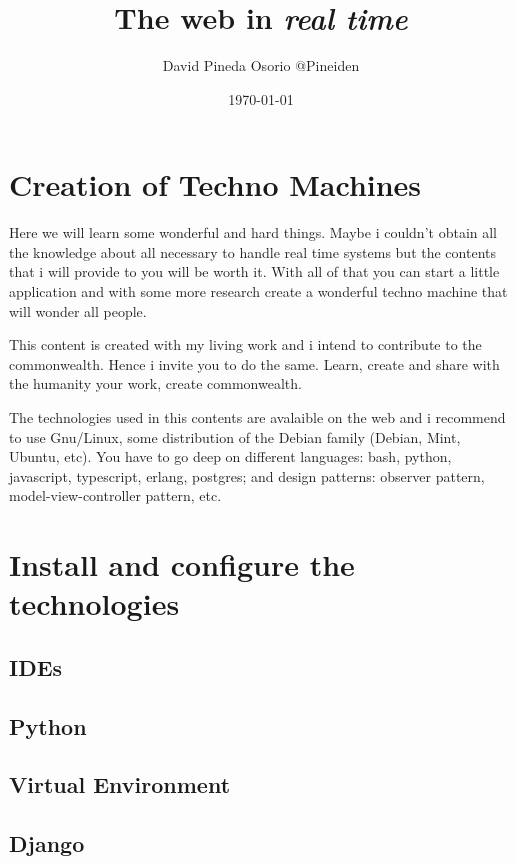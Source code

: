 \documentclass[11pt]{article}
\author{David Pineda Osorio @Pineiden}
\date{\today}
\title{The web in \emph{real time}}
\begin{document}
\maketitle
\tableofcontents


\section{Creation of Techno Machines}
\label{sec:orgf4ee783}

Here we will learn some wonderful and hard things. Maybe i couldn't obtain all the knowledge about 
all necessary  to handle real time systems but the contents that i will provide to you will be worth it.
With all of that you can start a little application and with some more research create a wonderful techno
machine that will wonder all people.

This content is created with my living work and i intend to contribute to the commonwealth. Hence i invite 
you to do the same. Learn, create and share with the humanity your work, create commonwealth.

The technologies used in this contents are avalaible on the web and i recommend to use Gnu/Linux, some distribution
of the Debian family (Debian, Mint, Ubuntu, etc). You have to go deep on different languages: bash, python, javascript, 
typescript, erlang, postgres; and design patterns: observer pattern, model-view-controller pattern, etc.

\section{Install and configure the technologies}
\label{sec:org9093205}

\subsection{IDEs}
\label{sec:org14488ab}

\subsection{Python}
\label{sec:org201f6c1}

\subsection{Virtual Environment}
\label{sec:org5d52381}

\subsection{Django}
\label{sec:org2f28669}
\end{document}
